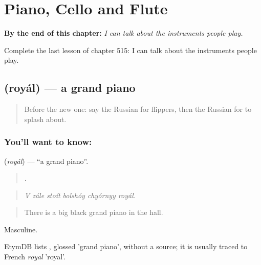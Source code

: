 
\chapter{Piano, Cello and Flute}
\label{ch:ru-piano-cello-and-flute}

\begin{chapteropening}
\textbf{By the end of this chapter:} \emph{I can talk about the instruments people play.}

Complete the last lesson of chapter 515: I can talk about the instruments people play.
\end{chapteropening}

\section[\texorpdfstring{\ru{рояль} (royál)}{рояль (royál)}]{ (royál) — a grand piano}

\label{lesson:RU-C515-royal}



\begin{quote}
Before the new one: say the Russian for flippers, then the Russian for to splash about.
\end{quote}

\subsection*{You'll want to know: }
\textbf{} (\emph{royál}) — \textquotedblleft{}a grand piano\textquotedblright{}.

\begin{quote}
     .
\end{quote}

\begin{quote}
\emph{V zále stoít bolshóy chyórnyy royál.}
\end{quote}

\begin{quote}
There is a big black grand piano in the hall.
\end{quote}

Masculine.

\begin{cousinweb}
EtymDB lists \emph{}, glossed 'grand piano', without a source; it is usually traced to French \emph{royal} 'royal'.
\end{cousinweb}

